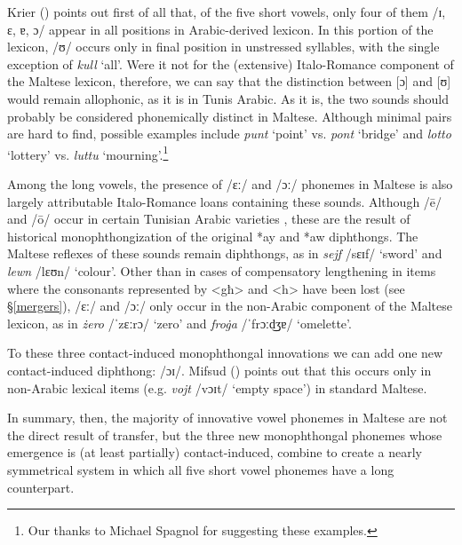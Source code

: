 \documentclass[output=paper]{langsci/langscibook}
\begin{document}
Krier (\citeyear[21]{krier1976}) points out first of all that, of the five short vowels, only four of them /ɪ, ɛ, ɐ, ɔ/ appear in all positions in Arabic-derived lexicon. In this portion of the lexicon, /ʊ/ occurs only in final position in unstressed syllables, with the single exception of \textit{kull} `all'. Were it not for the (extensive) Italo-Romance component of the Maltese lexicon, therefore, we can say that the distinction between [ɔ] and [ʊ] would remain allophonic, as it is in Tunis Arabic. As it is, the two sounds should probably be considered phonemically distinct in Maltese. Although minimal pairs are hard to find, possible examples include \textit{punt} `point' vs. \textit{pont} `bridge' and \textit{lotto} `lottery' vs. \textit{luttu} `mourning'.\footnote{Our thanks to Michael Spagnol for suggesting these examples.}

Among the long vowels, the presence of /ɛː/ and /ɔː/ phonemes in Maltese is also largely attributable Italo-Romance loans containing these sounds. Although /\={e}/ and /\={o}/ occur in certain Tunisian Arabic varieties \citep{Gibson2011,HerinZammit2017}, these are the result of historical monophthongization of the original *ay and *aw diphthongs. The Maltese reflexes of these sounds remain diphthongs, as in \textit{sejf} /sɛɪf/ `sword' and \textit{lewn} /lɛʊn/ `colour'. Other than in cases of compensatory lengthening in items where the consonants represented by <għ> and <h> have been lost (see §\ref{mergers}), /ɛː/ and /ɔː/ only occur in the non-Arabic component of the Maltese lexicon, as in \textit{żero} /ˈzɛːrɔ/ `zero' and \textit{froġa} /ˈfrɔːd͜ʒɐ/ `omelette'. 

To these three contact-induced monophthongal innovations we can add one new contact-induced diphthong: /ɔɪ/. Mifsud (\citeyear{mifsud2011}) points out that this occurs only in non-Arabic lexical items (e.g. \textit{vojt} /vɔɪt/ `empty space') in standard Maltese.

In summary, then, the majority of innovative vowel phonemes in Maltese are not the direct result of transfer, but the three new monophthongal phonemes whose emergence is (at least partially) contact-induced, combine to create a nearly symmetrical system in which all five short vowel phonemes have a long counterpart.
\end{document}
